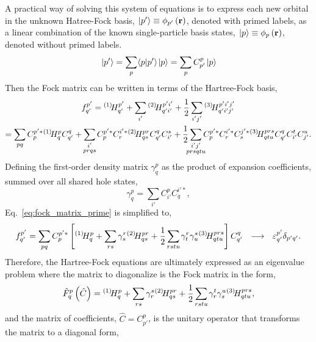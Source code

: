\documentclass[thesis.tex]{subfiles}
\begin{document}
A practical way of solving this system of equations is to express each new orbital in the unknown Hatree-Fock basis, $\hspace{1pt}\lvert p' \rangle \equiv \phi_{p'}\left(\mathbf{r}\right)$, denoted with primed labels, as a linear combination of the known single-particle basis states, $\hspace{1pt}\lvert p \rangle \equiv \phi_{p}\left(\mathbf{r}\right)$, denoted without primed labels.
\begin{equation}
  \hspace{1pt}\lvert p' \rangle = \sum_{p}\langle p | p'\rangle\hspace{1pt}\lvert p \rangle = \sum_{p}C^{p}_{p'}\hspace{1pt}\lvert p \rangle
\end{equation} \label{eq:fock_matrix_prime}
Then the Fock matrix can be written in terms of the Hartree-Fock basis,
\begin{gather}
  \fint{p'}{q'} = \Hint{1}{p'}{q'} + \sum_{\mathclap{i'}}\Hint{2}{p'i'}{q'i'} + \frac{1}{2}\sum_{\mathclap{i'j'}}\Hint{3}{p'i'j'}{q'i'j'} \notag \\
  = \sum_{\mathclap{pq}}C^{p'*}_{p}\Hint{1}{p}{q}C^{q}_{q'} + \sum_{\mathclap{\substack{i' \\ prqs}}}C^{p'*}_{p}C^{i'*}_{r}\Hint{2}{pr}{qs}C^{q}_{q'}C^{s}_{i'} + \frac{1}{2}\sum_{\mathclap{\substack{i'j' \\ prsqtu}}}C^{p'*}_{p}C^{i'*}_{r}C^{j'*}_{s}\Hint{3}{prs}{qtu}C^{q}_{q'}C^{t}_{i'}C^{u}_{j'}.
\end{gather}
Defining the first-order density matrix $\gamma^{p}_{q}$ as the product of expansion coefficients, summed over all shared hole states,
\begin{equation}
  \gamma^{p}_{q} = \sum_{i'}C^{p}_{i'}C^{i'*}_{q},
\end{equation}
Eq.\ \eqref{eq:fock_matrix_prime} is simplified to,
\begin{equation}
  \fint{p'}{q'} = \sum_{\mathclap{pq}}C^{p'*}_{p}\left[ \Hint{1}{p}{q} + \sum_{\mathclap{rs}}\gamma^{r}_{s}\Hint{2}{pr}{qs} + \frac{1}{2}\sum_{\mathclap{rstu}}\gamma^{r}_{t}\gamma^{s}_{u}\Hint{3}{prs}{qtu} \right]C^{q}_{q'}\ \ \longrightarrow\ \ \varepsilon^{p'}_{q'}\delta_{p'q'}.
\end{equation}
Therefore, the Hartree-Fock equations are ultimately expressed as an eigenvalue problem where the matrix to diagonalize is the Fock matrix in the form,
\begin{equation}
  \hat{F}^{p}_{q}\left(\hat{C}\right) = \Hint{1}{p}{q} + \sum_{\mathclap{rs}}\gamma^{s}_{r}\Hint{2}{pr}{qs} + \frac{1}{2}\sum_{\mathclap{rstu}}\gamma^{t}_{r}\gamma^{u}_{s}\Hint{3}{prs}{qtu},
\end{equation}
and the matrix of coefficients, $\hat{C} = C^{p}_{p'}$, is the unitary operator that transforms the matrix to a diagonal form,
\end{document}
